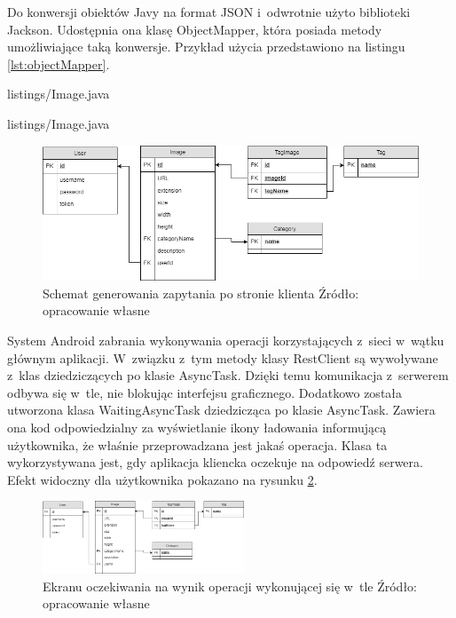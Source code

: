 Do konwersji obiektów Javy na format JSON i~odwrotnie użyto biblioteki Jackson.
Udostępnia ona klasę ObjectMapper, która posiada metody umożliwiające taką konwersje. Przykład użycia przedstawiono na listingu \ref{lst:objectMapper}.


{listings/Image.java}


{listings/Image.java}

\begin{figure}[ht]
	\centering
	\includegraphics[width = 15cm]{images/bazaDanych}
	\caption{Schemat generowania zapytania po stronie klienta
		\newline Źródło: opracowanie własne}
	\label{fig:clientRequest}
\end{figure}

System Android zabrania wykonywania operacji korzystających z~sieci w~wątku
głównym aplikacji. W~związku z~tym metody klasy RestClient są wywoływane z~klas
dziedziczących po klasie AsyncTask. Dzięki temu komunikacja z~serwerem odbywa
się w~tle, nie blokując interfejsu graficznego. Dodatkowo została utworzona
klasa WaitingAsyncTask dziedzicząca po klasie AsyncTask. Zawiera
ona kod odpowiedzialny za wyświetlanie ikony ładowania informującą użytkownika, że właśnie przeprowadzana jest jakaś operacja. Klasa ta wykorzystywana jest, gdy aplikacja kliencka oczekuje na odpowiedź serwera. Efekt widoczny dla użytkownika pokazano na rysunku \ref{fig:waitingTask}.

\begin{figure}[ht]
	\centering
	\includegraphics[width = 6cm]{images/bazaDanych}
	\caption{Ekranu oczekiwania na wynik operacji wykonującej się w~tle	\newline Źródło: opracowanie własne}
	\label{fig:waitingTask}
\end{figure}

